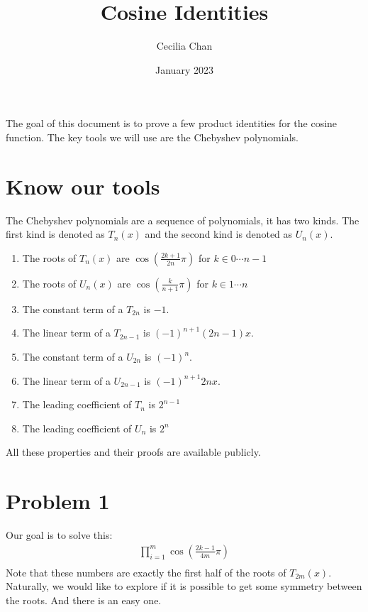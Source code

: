 \documentclass{article}
\title{Cosine Identities}
\author{Cecilia Chan}
\date{January 2023}
\begin{document}
\maketitle
The goal of this document is to prove a few product identities for the cosine function. The key tools we will use are the Chebyshev polynomials.

\section{Know our tools}
The Chebyshev polynomials are a sequence of polynomials, it has two kinds. The first kind is denoted as $ T_n(x) $ and the second kind is denoted as $ U_n(x) $.

\begin{enumerate}
    \item The roots of $ T_n(x) $ are $ \cos\left(\frac{2k + 1}{2n}\pi \right) $ for $ k \in 0 \cdots n - 1 $
    \item The roots of $ U_n(x) $ are $ \cos\left(\frac{k}{n + 1}\pi \right) $ for $ k \in 1 \cdots n $
    \item The constant term of a $ T_{2n} $ is $ -1 $.
    \item The linear term of a $ T_{2n-1} $ is $ (-1)^{n+1} (2n-1)x $.
    \item The constant term of a $ U_{2n} $ is $ (-1)^n $.
    \item The linear term of a $ U_{2n-1} $ is $ (-1)^{n+1} 2nx $.
    
    \item The leading coefficient of $ T_{n} $ is $ 2^{n-1} $
    \item The leading coefficient of $ U_{n} $ is $ 2^n $
\end{enumerate}

All these properties and their proofs are available publicly.

\section{Problem 1}
Our goal is to solve this:
\begin{eqnarray*}
  \prod_{i=1}^{m}{\cos\left(\frac{2k-1}{4m}\pi\right)} \\
\end{eqnarray*}
Note that these numbers are exactly the first half of the roots of $ T_{2m}(x) $. Naturally, we would like to explore if it is possible to get some symmetry between the roots. And there is an easy one.
\end{document}
